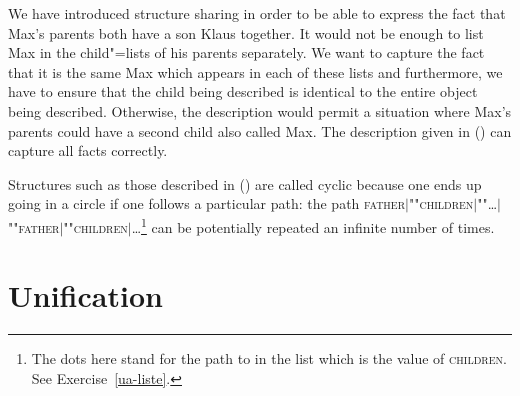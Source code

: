 We have introduced structure sharing in order to be able to express
the fact that Max's parents both have a son Klaus together. It would not be enough to list Max in
the child"=lists of his parents separately. We want to capture the fact that it is the same Max which
appears in each of these lists and furthermore, we have to ensure that the child being described is
identical to the entire object being described. Otherwise, the description would permit a situation where Max's
parents could have a second child also called Max.  The description given in
() can capture all facts correctly.
\begin{figure}
\ea
\label{bsp-avm-zyklen}
 
\z
\vspace{-\baselineskip}\end{figure}%
Structures such as those described in () are called cyclic because one ends up going in a circle if one follows a particular path: \eg the path 
\textsc{father$|$""children$|$""\ldots$|$""father$|$""children$|$\ldots}\footnote{
	The dots here stand for the path to  in the list which is the value of \textsc{children}. See Exercise~\ref{ua-liste}.%
}
can be potentially repeated an infinite number of times.

\section{Unification}
\label{sec-unification}

